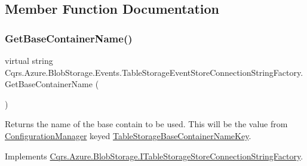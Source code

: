 \subsection{Member Function Documentation}
\mbox{\label{classCqrs_1_1Azure_1_1BlobStorage_1_1Events_1_1TableStorageEventStoreConnectionStringFactory_a118388598a7fa653122fc11521c915d7_a118388598a7fa653122fc11521c915d7}} 
\subsubsection{\texorpdfstring{Get\+Base\+Container\+Name()}{GetBaseContainerName()}}
{\footnotesize\ttfamily virtual string Cqrs.\+Azure.\+Blob\+Storage.\+Events.\+Table\+Storage\+Event\+Store\+Connection\+String\+Factory.\+Get\+Base\+Container\+Name (\begin{DoxyParamCaption}{ }\end{DoxyParamCaption})\hspace{0.3cm}{\ttfamily [virtual]}}



Returns the name of the base contain to be used. This will be the value from \hyperlink{namespaceCqrs_1_1Azure_1_1ConfigurationManager}{Configuration\+Manager} keyed \hyperlink{classCqrs_1_1Azure_1_1BlobStorage_1_1Events_1_1TableStorageEventStoreConnectionStringFactory_a9aad5e7497e3f5192d3aaec8d5f7b5f8_a9aad5e7497e3f5192d3aaec8d5f7b5f8}{Table\+Storage\+Base\+Container\+Name\+Key}. 



Implements \hyperlink{interfaceCqrs_1_1Azure_1_1BlobStorage_1_1ITableStorageStoreConnectionStringFactory_a1b9bfc9dcb7292e62619fc46e4a85982_a1b9bfc9dcb7292e62619fc46e4a85982}{Cqrs.\+Azure.\+Blob\+Storage.\+I\+Table\+Storage\+Store\+Connection\+String\+Factory}.

